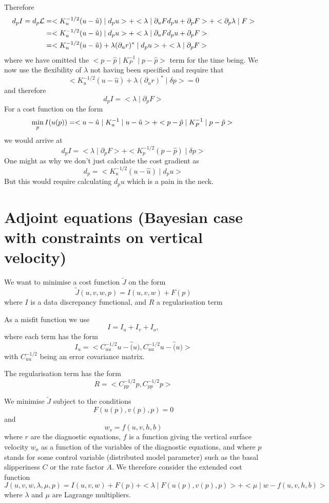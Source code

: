 \documentclass[10pt,a4paper]{book}
\newcommand{\p}{\partial}
\begin{document}
Therefore
\begin{align*}
  d_p I=d_p \cal{L}
  &=  <K_u^{-1/2} (u-\hat{u} ) \mid d_p u > +  <\lambda \mid \p_u F d_p u + \p_p F > + < \p_p \lambda \mid F >\\
  &=  <K_u^{-1/2} (u-\hat{u} ) \mid d_p u > +  <\lambda \mid \p_u F d_p u + \p_p F > \\
  &= < K_u^{-1/2} (u-\hat{u} ) + \lambda (\p_u r)^\ast \mid d_p u > + <\lambda \mid  \p_p F > 
\end{align*}
where we have omitted the $ < p -\hat{p} \mid K_P^{-1} \mid p -\hat{p} > $ term for the time being.
We now use the flexibility of $\lambda$ not having been specified and require that
\[
 < K_u^{-1/2} (u-\hat{u} ) + \lambda (\p_u r)^\ast \mid \delta p >  =0 
\]
and therefore
\[
d_p I = < \lambda \mid \p_p F >
\]
For a cost function on the form
\[
\min_{p} I(u(p)) = < u -\hat{u} \mid K_u^{-1} \mid u -\hat{u} > + < p -\hat{p} \mid K_P^{-1} \mid p -\hat{p} >  \\
\]
we would arrive at 
\[
d_p I = < \lambda \mid \p_p F > + <K_p^{-1/2} (p-\hat{p} ) \mid \delta p > 
\]
One might as why we don't just calculate the cost gradient as
\[
d_p =  <K_u^{-1/2} (u-\hat{u} ) \mid d_p u > 
\]
But this would require calculating  $d_p u$ which is a pain in the neck.


\section{Adjoint equations (Bayesian case with constraints on vertical velocity)}

We want to minimise a cost function $\tilde{J}$ on the form
\[
\tilde{J}(u,v,w,p)=I(u,v,w)+F(p)
\]
where $I$ is a data discrepancy functional, and $R$ a regularisation term


As a misfit function we use
\[ I=I_u+I_v+I_o ,\]
where each term has the form
\[
I_u=<C^{-1/2}_{uu} u-\hat(u) , C^{-1/2}_{uu} u-\hat(u) >
\]
with $C^{-1/2}_{uu}$ being an error covariance matrix.

The regularisation term has the form
\[
R=<C^{-1/2}_{pp} p , C^{-1/2}_{pp} p >
\]

We minimise $\tilde{J}$ subject to the conditions 
\[ F(u(p),v(p),p)=0\]
and 
\[
w_s=f(u,v,h,b)
\]
where $r$ are the diagnostic equations, $f$ is a function giving
the vertical surface velocity $w_o$ as a function of the variables of
the diagnostic equations, and where $p$ stands for some control variable
(distributed model parameter) such as the basal slipperiness $C$ or
the rate factor $A$. We therefore consider the extended cost function
\[
J(u,v,w,\lambda,\mu,p)=I(u,v,w)+F(p)+<\lambda\mid F(u(p),v(p),p)>+<\mu\mid w-f(u,v,h,b)>
\]
where $\lambda$ and $\mu$ are Lagrange multipliers.
\end{document}
